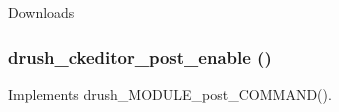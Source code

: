 Downloads \hypertarget{ckeditor_8drush_8inc_4ff812b91c4557cb3c2c45568d6877cd}{
\subsubsection[{drush\_\-ckeditor\_\-post\_\-enable}]{\setlength{\rightskip}{0pt plus 5cm}drush\_\-ckeditor\_\-post\_\-enable ()}}
\label{ckeditor_8drush_8inc_4ff812b91c4557cb3c2c45568d6877cd}


Implements drush\_\-MODULE\_\-post\_\-COMMAND(). 